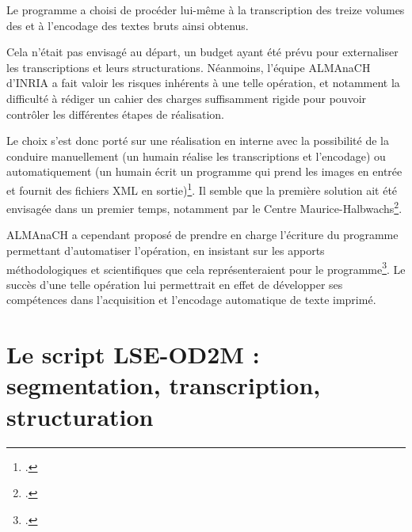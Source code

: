 Le programme \timeus{} a choisi de procéder lui-même à la transcription des treize volumes des \odm{} et à l'encodage des textes bruts ainsi obtenus. 

Cela n'était pas envisagé au départ, un budget ayant été prévu pour externaliser les transcriptions et leurs structurations. Néanmoins, l'équipe ALMAnaCH d'INRIA a fait valoir les risques inhérents à une telle opération, et notamment la difficulté à rédiger un cahier des charges suffisamment rigide pour pouvoir contrôler les différentes étapes de réalisation.

Le choix s'est donc porté sur une réalisation en interne avec la possibilité de la conduire manuellement (un humain réalise les transcriptions et l'encodage) ou automatiquement (un humain écrit un programme qui prend les images en entrée et fournit des fichiers XML en sortie)\footcite[p. 52]{chague}. Il semble que la première solution ait été envisagée dans un premier temps, notamment par le Centre Maurice-Halbwachs\footcite[p. 52]{chague}. 

ALMAnaCH a cependant proposé de prendre en charge l'écriture du programme permettant d'automatiser l'opération, en insistant sur les apports méthodologiques et scientifiques que cela représenteraient pour le programme\footcite[p. 52]{chague}. Le succès d'une telle opération lui permettrait en effet de développer ses compétences dans l'acquisition et l'encodage automatique de texte imprimé.

\section[Le script LSE-OD2M]{Le script \textsc{LSE-OD2M} : segmentation, transcription, structuration}